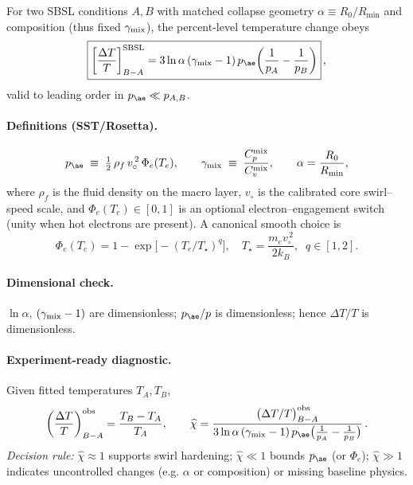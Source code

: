\documentclass[reprint,aps,onecolumn,nofootinbib]{revtex4-2}
\begin{document}
        \begin{corollary}
        For two SBSL conditions $A,B$ with matched collapse geometry $\alpha\equiv R_0/R_{\min}$ and composition (thus fixed $\gamma_{\rm mix}$), the percent-level temperature change obeys
        \[
            \boxed{
                \left[\frac{\Delta T}{T}\right]^{\rm SBSL}_{B-A}
                = 3\ln\alpha\,(\gamma_{\rm mix}-1)\,p_{\ae}\!\left(\frac{1}{p_A}-\frac{1}{p_B}\right)
            }\,,
        \]
        valid to leading order in $p_{\ae}\ll p_{A,B}$.
        \end{corollary}

    \paragraph{Definitions (SST/Rosetta).}
        \[
            p_{\ae}\;\equiv\;\tfrac12\,\rho_f\,v_{\circ}^{\,2}\,\Phi_e(T_e),
            \qquad
            \gamma_{\rm mix}\;\equiv\; \frac{C_p^{\rm mix}}{C_v^{\rm mix}},
            \qquad
            \alpha=\frac{R_0}{R_{\min}},
        \]
        where $\rho_f$ is the fluid density on the macro layer, $v_{\circ}$ is the calibrated core swirl–speed scale, and $\Phi_e(T_e)\in[0,1]$ is an optional electron–engagement switch (unity when hot electrons are present). A canonical smooth choice is
        \[
            \Phi_e(T_e)=1-\exp\!\Big[-(T_e/T_\star)^q\Big],\quad
            T_\star=\frac{m_e v_{\circ}^{\,2}}{2k_B},\;\; q\in[1,2].
        \]

    \paragraph{Dimensional check.}
        $\ln\alpha$, $(\gamma_{\rm mix}-1)$ are dimensionless; $p_{\ae}/p$ is dimensionless; hence $\Delta T/T$ is dimensionless.

    \paragraph{Experiment-ready diagnostic.}
        Given fitted temperatures $T_A,T_B$,
        \[
            \left(\frac{\Delta T}{T}\right)^{\rm obs}_{B-A}=\frac{T_B-T_A}{T_A},\qquad
            \widehat{\chi}=\frac{\big(\Delta T/T\big)^{\rm obs}_{B-A}}{
                3\ln\alpha\,(\gamma_{\rm mix}-1)\,p_{\ae}\big(\frac{1}{p_A}-\frac{1}{p_B}\big)}\,.
        \]
        \emph{Decision rule:} $\widehat{\chi}\approx 1$ supports swirl hardening; $\widehat{\chi}\ll 1$ bounds $p_{\ae}$ (or $\Phi_e$); $\widehat{\chi}\gg 1$ indicates uncontrolled changes (e.g. $\alpha$ or composition) or missing baseline physics.
\end{document}
